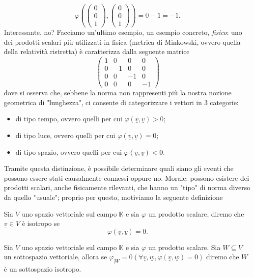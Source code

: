 $$
	\varphi(\begin{pmatrix} 0 \\ 0 \\ 1 \end{pmatrix}, \begin{pmatrix} 0 \\ 0 \\ 1 \end{pmatrix}) = 0 - 1 = -1.
$$
Interessante, no? Facciamo un'ultimo esempio, un esempio concreto, \emph{fisico}: uno dei prodotti scalari più utilizzati in fisica (metrica di Minkowski, ovvero quella della relatività ristretta) è caratterizza dalla seguente matrice
$$
	\begin{pmatrix}
		1 & 0 & 0 & 0 \\
		0 & -1 & 0 & 0 \\
		0 & 0 & -1 & 0 \\
		0 & 0 & 0 & -1
	\end{pmatrix}
$$
dove si osserva che, sebbene la norma non rappresenti più la nostra nozione geometrica di "lunghezza", ci consente di categorizzare i vettori in 3 categorie:
\begin{itemize}
	\item di tipo tempo, ovvero quelli per cui $\varphi(\underline{v}, \underline{v}) > 0$;
	\item di tipo luce, ovvero quelli per cui $\varphi(\underline{v}, \underline{v}) = 0$;
	\item di tipo spazio, ovvero quelli per cui $\varphi(\underline{v}, \underline{v}) < 0$.
\end{itemize}
Tramite questa distinzione, è possibile determinare quali siano gli eventi che possono essere stati causalmente connessi oppure no. Morale: possono esistere dei prodotti scalari, anche fisicamente rilevanti, che hanno un "tipo" di norma diverso da quello "usuale"; proprio per questo, motiviamo la seguente definizione
\begin{definition}
	Sia $V$ uno spazio vettoriale sul campo $\mathbb{K}$ e sia $\varphi$ un prodotto scalare, diremo che $\underline{v} \in V$ è isotropo se
	$$
		\varphi(\underline{v}, \underline{v}) = 0.
	$$
\end{definition}
\begin{definition}
	Sia $V$ uno spazio vettoriale sul campo $\mathbb{K}$ e sia $\varphi$ un prodotto scalare. Sia $W \subseteq V$ un sottospazio vettoriale, allora se $\varphi_{|W} = 0 (\forall \underline{v}, \underline{w}, \varphi(\underline{v}, \underline{w}) = 0)$ diremo che $W$ è un sottospazio isotropo.
\end{definition}

